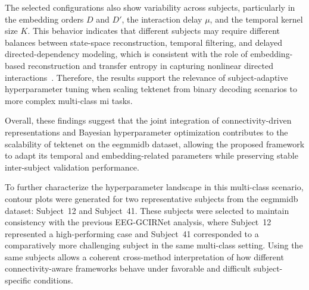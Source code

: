 The selected configurations also show variability across subjects, particularly in the embedding orders $D$ and $D'$, the interaction delay $\mu$, and the temporal kernel size $K$. This behavior indicates that different subjects may require different balances between state-space reconstruction, temporal filtering, and delayed directed-dependency modeling, which is consistent with the role of embedding-based reconstruction and transfer entropy in capturing nonlinear directed interactions~\cite{takens1981detecting,schreiber2000measuring}. Therefore, the results support the relevance of subject-adaptive hyperparameter tuning when scaling \gls{tektenet} from binary decoding scenarios to more complex multi-class \gls{mi} tasks.

Overall, these findings suggest that the joint integration of connectivity-driven representations and Bayesian hyperparameter optimization contributes to the scalability of \gls{tektenet} on the \gls{eegmmidb} dataset, allowing the proposed framework to adapt its temporal and embedding-related parameters while preserving stable inter-subject validation performance.

{To further characterize the hyperparameter landscape in this multi-class scenario, contour plots were generated for two representative subjects from the \gls{eegmmidb} dataset: Subject~12 and Subject~41. These subjects were selected to maintain consistency with the previous EEG-GCIRNet analysis, where Subject~12 represented a high-performing case and Subject~41 corresponded to a comparatively more challenging subject in the same multi-class setting. Using the same subjects allows a coherent cross-method interpretation of how different connectivity-aware frameworks behave under favorable and difficult subject-specific conditions.}

